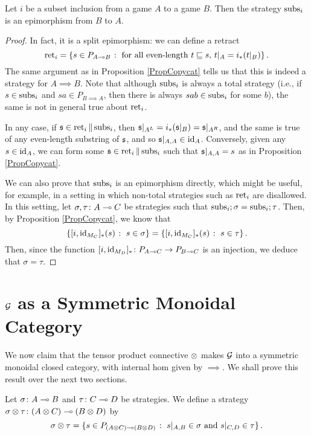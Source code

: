 \begin{proposition}
  Let $i$ be a subset inclusion from a game $A$ to a game $B$.  
  Then the strategy $\operatorname{subs}_i$ is an epimorphism from $B$ to $A$.
  \label{PropSubsetInclusionEpic}
\end{proposition}
\begin{proof}
  In fact, it is a split epimorphism: we can define a retract
  \[
    \operatorname{ret}_i = \{s\in P_{A\multimap B}\;\colon\;\text{for all even-length $t\sqsubseteq s$, $t\vert_A=i_*(t\vert_B)$}\}\,.
    \]
  The same argument as in Proposition \ref{PropCopycat} tells us that this is indeed a strategy for $A\implies B$.
  Note that although $\operatorname{subs}_i$ is always a total strategy (i.e., if $s\in\operatorname{subs}_i$ and $sa\in P_{B\implies A}$, then there is always $sab\in\operatorname{subs}_i$ for some $b$), the same is not in general true about $\operatorname{ret}_i$.  

  In any case, if $\mathfrak s\in\operatorname{ret}_i\|\operatorname{subs}_i$, then $\mathfrak s\vert_{A^L} = i_*(\mathfrak s\vert_B) = \mathfrak s\vert_{A^R}$, and the same is true of any even-length substring of $\mathfrak s$, and so $\mathfrak s\vert_{A,A}\in\operatorname{id}_A$.  
  Conversely, given any $s\in \operatorname{id}_A$, we can form some $\mathfrak s\in\operatorname{ret}_i\|\operatorname{subs}_i$ such that $\mathfrak s\vert_{A,A}=s$ as in Proposition \ref{PropCopycat}.

  We can also prove that $\operatorname{subs}_i$ is an epimorphism directly, which might be useful, for example, in a setting in which non-total strategies such as $\operatorname{ret}_i$ are disallowed.  
  In this setting, let $\sigma,\tau\colon A \multimap C$ be strategies such that $\operatorname{subs}_i;\sigma=\operatorname{subs}_i;\tau$.  
  Then, by Proposition \ref{PropCopycat}, we know that
  \[
    \{[i,\operatorname{id}_{M_C}]_*(s)\;\colon\; s\in\sigma\}
    =
    \{[i,\operatorname{id}_{M_C}]_*(s)\;\colon\; s\in\tau\}\,.
    \]
  Then, since the function $[i,\operatorname{id}_{M_D}]_* \colon P_{A\multimap C} \to P_{B\multimap C}$ is an injection, we deduce that $\sigma=\tau$.
\end{proof}

\section{$\mathcal G$ as a Symmetric Monoidal Category}

We now claim that the tensor product connective $\otimes$ makes $\mathcal G$ into a symmetric monoidal closed category, with internal hom given by $\implies$.  
We shall prove this result over the next two sections.

\begin{definition}
  Let $\sigma\colon A \multimap B$ and $\tau\colon C \multimap D$ be strategies.  
  We define a strategy $\sigma\otimes\tau\colon (A\otimes C) \multimap (B \otimes D)$ by
  \[
    \sigma\otimes\tau = \{s\in P_{(A\otimes C)\multimap (B\otimes D)}\;\colon\; s\vert_{A,B}\in\sigma\text{ and }s\vert_{C,D}\in\tau\}\,.
    \]
\end{definition}

